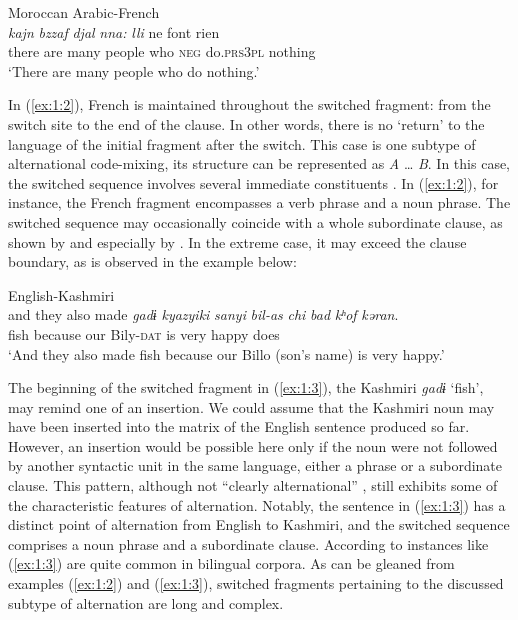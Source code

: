 \ea
\label{ex:1:2}
Moroccan Arabic-French \citep[311]{bentahila-davies-1983}\\
\gll \textit{kajn} \textit{bzzaf} \textit{djal} \textit{nna:} \textit{lli} ne font rien\\
	there are many people who \textsc{neg} do.\textsc{prs3pl} nothing\\
\glt `There are many people who do nothing.'
\z

\noindent In (\ref{ex:1:2}), French is maintained throughout the switched fragment: from the switch site to the end of the clause. In other words, there is no `return' to the language of the initial fragment after the switch. This case is one subtype of alternational code-mixing, its structure can be represented as \textit{A} \dots{} \textit{B}. In this case, the switched sequence involves several immediate constituents \citep[cf.][96]{muysken-bilingual-2000}. In (\ref{ex:1:2}), for instance, the French fragment encompasses a verb phrase and a noun phrase. The switched sequence may occasionally coincide with a whole subordinate clause, as shown by \citet[312]{pfaff-1979} and especially by \citet[196--200]{treffers-daller-mixing-1994}. In the extreme case, it may exceed the clause boundary, as is observed in the example below:

\ea
\label{ex:1:3}
English-Kashmiri \citep[228]{bhatt-1997}\\
\gll {\dots} and they also made \textit{gadɨ} \textit{kyazyiki} \textit{sanyi} \textit{bil-as} \textit{chi} \textit{bad} \textit{kʰof} \textit{kəran}.\\
	{} {} {} {} {} fish because our Bily-\textsc{dat} is very happy does\\
\glt `And they also made fish because our Billo (son's name) is very happy.' 
\z

\noindent The beginning of the switched fragment in (\ref{ex:1:3}), the Kashmiri \textit{gadɨ} `fish', may remind one of an insertion. We could assume that the Kashmiri noun may have been inserted into the matrix of the English sentence produced so far. However, an insertion would be possible here only if the noun were not followed by another syntactic unit in the same language, either a phrase or a subordinate clause. This pattern, although not ``clearly alternational'' \citep[102]{muysken-bilingual-2000}, still exhibits some of the characteristic features of alternation. Notably, the sentence in (\ref{ex:1:3}) has a distinct point of alternation from English to Kashmiri, and the switched sequence comprises a noun phrase and a subordinate clause. According to \citet[303]{auer2014} instances like (\ref{ex:1:3}) are quite common in bilingual corpora. As can be gleaned from examples (\ref{ex:1:2}) and (\ref{ex:1:3}), switched fragments pertaining to the discussed subtype of alternation are long and complex.

